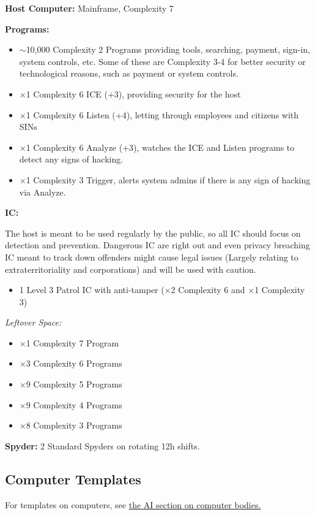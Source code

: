 \begin{multicols}{2}
	\hspace{\parindent}\textbf{Host Computer:} Mainframe, Complexity 7
	
	\textbf{Programs:}
	
	\begin{itemize}
		\itemsep 0pt
		\item $\sim$10,000 Complexity 2 Programs providing tools, searching, payment, sign-in, system controls, etc. Some of these are Complexity 3-4 for better security or technological reasons, such as payment or system controls.
		\item $\times$1 Complexity 6 ICE (+3), providing security for the host
		\item $\times$1 Complexity 6 Listen (+4), letting through employees and citizens with SINs
		\item $\times$1 Complexity 6 Analyze (+3), watches the ICE and Listen programs to detect any signs of hacking.
		\item $\times$1 Complexity 3 Trigger, alerts system admins if there is any sign of hacking via Analyze.
	\end{itemize}

	\textbf{IC:}
	
	The host is meant to be used regularly by the public, so all IC should focus on detection and prevention. Dangerous IC are right out and even privacy breaching IC meant to track down offenders might cause legal issues (Largely relating to extraterritoriality and corporations) and will be used with caution.
	
	\begin{itemize}
		\itemsep 0pt
		\item 1 Level 3 Patrol IC with anti-tamper ($\times$2 Complexity 6 and $\times$1 Complexity 3)
	\end{itemize}
	
	
	\textit{Leftover Space:}
	\begin{itemize}
		\itemsep 0pt
		\item $\times$1 Complexity 7 Program
		\item $\times$3 Complexity 6 Programs
		\item $\times$9 Complexity 5 Programs
		\item $\times$9 Complexity 4 Programs
		\item $\times$8 Complexity 3 Programs
	\end{itemize}
	
	\textbf{Spyder:}
	2 Standard Spyders on rotating 12h shifts.
	
	
	\subsection*{Computer Templates}
	
	For templates on computers, see \hyperref[ai_computer]{the AI section on computer bodies.}
	
\end{multicols}